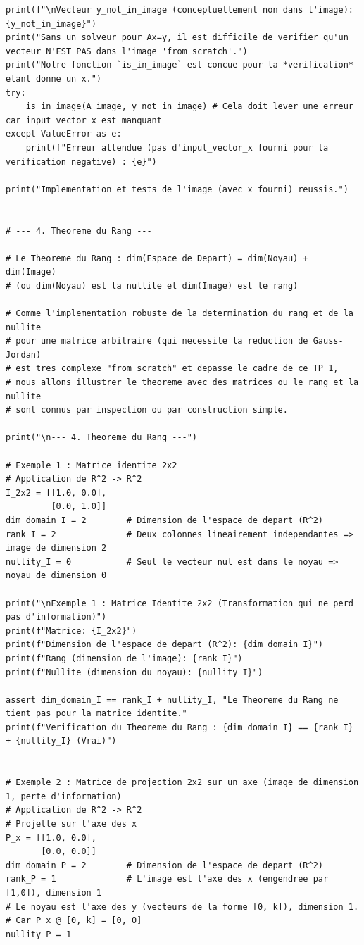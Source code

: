 \documentclass{report}
\begin{document}
\begin{verbatim}
print(f"\nVecteur y_not_in_image (conceptuellement non dans l'image): {y_not_in_image}")
print("Sans un solveur pour Ax=y, il est difficile de verifier qu'un vecteur N'EST PAS dans l'image 'from scratch'.")
print("Notre fonction `is_in_image` est concue pour la *verification* etant donne un x.")
try:
    is_in_image(A_image, y_not_in_image) # Cela doit lever une erreur car input_vector_x est manquant
except ValueError as e:
    print(f"Erreur attendue (pas d'input_vector_x fourni pour la verification negative) : {e}")

print("Implementation et tests de l'image (avec x fourni) reussis.")


# --- 4. Theoreme du Rang ---

# Le Theoreme du Rang : dim(Espace de Depart) = dim(Noyau) + dim(Image)
# (ou dim(Noyau) est la nullite et dim(Image) est le rang)

# Comme l'implementation robuste de la determination du rang et de la nullite
# pour une matrice arbitraire (qui necessite la reduction de Gauss-Jordan)
# est tres complexe "from scratch" et depasse le cadre de ce TP 1,
# nous allons illustrer le theoreme avec des matrices ou le rang et la nullite
# sont connus par inspection ou par construction simple.

print("\n--- 4. Theoreme du Rang ---")

# Exemple 1 : Matrice identite 2x2
# Application de R^2 -> R^2
I_2x2 = [[1.0, 0.0],
         [0.0, 1.0]]
dim_domain_I = 2        # Dimension de l'espace de depart (R^2)
rank_I = 2              # Deux colonnes lineairement independantes => image de dimension 2
nullity_I = 0           # Seul le vecteur nul est dans le noyau => noyau de dimension 0

print("\nExemple 1 : Matrice Identite 2x2 (Transformation qui ne perd pas d'information)")
print(f"Matrice: {I_2x2}")
print(f"Dimension de l'espace de depart (R^2): {dim_domain_I}")
print(f"Rang (dimension de l'image): {rank_I}")
print(f"Nullite (dimension du noyau): {nullity_I}")

assert dim_domain_I == rank_I + nullity_I, "Le Theoreme du Rang ne tient pas pour la matrice identite."
print(f"Verification du Theoreme du Rang : {dim_domain_I} == {rank_I} + {nullity_I} (Vrai)")


# Exemple 2 : Matrice de projection 2x2 sur un axe (image de dimension 1, perte d'information)
# Application de R^2 -> R^2
# Projette sur l'axe des x
P_x = [[1.0, 0.0],
       [0.0, 0.0]]
dim_domain_P = 2        # Dimension de l'espace de depart (R^2)
rank_P = 1              # L'image est l'axe des x (engendree par [1,0]), dimension 1
# Le noyau est l'axe des y (vecteurs de la forme [0, k]), dimension 1.
# Car P_x @ [0, k] = [0, 0]
nullity_P = 1


\end{verbatim}
\end{document}
